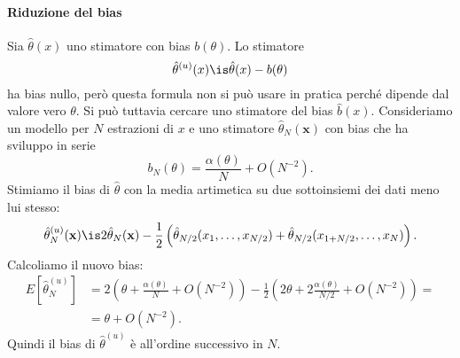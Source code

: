 \paragraph{Riduzione del bias}

Sia $\hat\theta(x)$ uno stimatore con bias $b(\theta)$.
Lo stimatore
\begin{equation*}
	\hat\theta^{(u)}(x)
	\is \hat\theta(x) - b(\theta)
\end{equation*}
ha bias nullo,
però questa formula non si può usare in pratica perché dipende dal valore vero $\theta$.
Si può tuttavia cercare uno stimatore del bias $\hat b(x)$.
Consideriamo un modello per $N$ estrazioni di $x$
e uno stimatore $\hat\theta_N(\mathbf x)$
con bias che ha sviluppo in serie
\begin{equation*}
	b_N(\theta)
	= \frac{\alpha(\theta)}N + O(N^{-2}).
\end{equation*}
Stimiamo il bias di $\hat\theta$ con la media artimetica su due sottoinsiemi dei dati meno lui stesso:
\begin{equation*}
	\hat\theta^{(u)}_N(\mathbf x)
	\is 2\hat\theta_N(\mathbf x)
	- \frac12 \left( \hat\theta_{N/2}(x_1,\dots,x_{N/2}) + \hat\theta_{N/2}(x_{1+N/2},\dots,x_N) \right).
\end{equation*}
Calcoliamo il nuovo bias:
\begin{align*}
	E[\hat\theta^{(u)}_N]
	&= 2 \left( \theta + \frac{\alpha(\theta)}N + O(N^{-2}) \right)
	- \frac12 \left( 2\theta + 2 \frac{\alpha(\theta)}{N/2} + O(N^{-2}) \right) = \\
	&= \theta + O(N^{-2}).
\end{align*}
Quindi il bias di $\hat\theta^{(u)}$ è all'ordine successivo in $N$.
